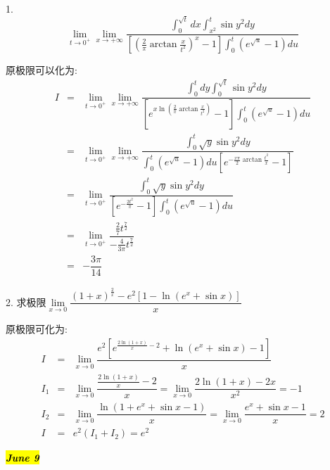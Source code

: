 1. $$\lim\limits_{t\rightarrow 0^{+}}\lim\limits_{x\rightarrow+\infty}\dfrac{\int_{0}^{\sqrt{t}}dx\int_{x^2}^{t}\sin y^2dy}{\left[\left( \frac{2}{\pi}\arctan \frac{x}{t^2}\right)^{x}-1\right]\int_{0}^{t}(e^{\sqrt{u}}-1)du }$$
\begin{solution}
	
	原极限可以化为: 
	\begin{eqnarray*}
		I&=&\lim\limits_{t\rightarrow 0^{+}}\lim\limits_{x\rightarrow+\infty}\dfrac{\int_{0}^{t}dy\int_{0}^{\sqrt{t}}\sin y^2dy}{[e^{x\ln(\frac{2}{\pi}\arctan \frac{x}{t^2})}-1]\int_{0}^{t}(e^{\sqrt{u}}-1)du}\\
		&=&\lim\limits_{t\rightarrow 0^{+}}\lim\limits_{x\rightarrow+\infty}\dfrac{\int_{0}^{t}\sqrt{y}\sin y^2dy}{\int_{0}^{t}(e^{\sqrt{u}}-1)du[e^{-\frac{x\pi}{2}\arctan\frac{t^2}{x}}-1]}\\
		&=&\lim\limits_{t\rightarrow 0^{+}}\dfrac{\int_{0}^{t}\sqrt{y}\sin y^2dy}{[e^{-\frac{2t^2}{\pi}}-1]\int_{0}^{t}(e^{\sqrt{u}}-1)du}\\
		&=&\lim\limits_{t\rightarrow 0^{+}}\dfrac{\frac{2}{7}t^{\frac{7}{2}}}{-\frac{4}{3\pi}t^{\frac{7}{2}}}\\
		&=&-\dfrac{3\pi}{14}
	\end{eqnarray*}
\end{solution}

2. 求极限$\lim\limits_{x\rightarrow 0}\dfrac{(1+x)^{\frac{2}{x}}-e^2[1-\ln(e^x+\sin x)]}{x}$
\begin{solution}
	
	原极限可化为: 
	\begin{eqnarray*}
		I&=&\lim\limits_{x\rightarrow 0}\dfrac{e^2[e^{\frac{2\ln(1+x)}{x}-2}+\ln(e^x+\sin x)-1]}{x}\\
		I_{1}&=&\lim\limits_{x\rightarrow 0}\dfrac{\frac{2\ln(1+x)}{x}-2}{x}=\lim\limits_{x\rightarrow 0}\dfrac{2\ln(1+x)-2x}{x^2}=-1\\
		I_{2}&=&\lim\limits_{x\rightarrow 0}\dfrac{\ln(1+e^x+\sin x-1)}{x}=\lim\limits_{x\rightarrow 0}\dfrac{e^x+\sin x-1}{x}=2\\
		I&=&e^2(I_{1}+I_{2})=e^2
	\end{eqnarray*}
\end{solution}

\hl{\textbf{\textit{June 9}}}

